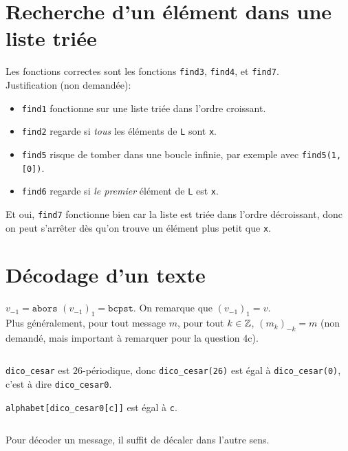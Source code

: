 
\section*{Recherche d'un élément dans une liste triée}

\ques Les fonctions correctes sont les fonctions \texttt{find3}, \texttt{find4}, et \texttt{find7}.\\

Justification (non demandée):
\begin{itemize}[label=$ \bullet $]
    \item \texttt{find1} fonctionne sur une liste triée dans l'ordre croissant.
    \item \texttt{find2} regarde si \emph{tous} les éléments de \texttt{L} sont \texttt{x}.
    \item \texttt{find5} risque de tomber dans une boucle infinie, par exemple avec \texttt{find5(1, [0])}.
    \item \texttt{find6} regarde si \emph{le premier} élément de \texttt{L} est \texttt{x}.
\end{itemize}
Et oui, \texttt{find7} fonctionne bien car la liste est triée dans l'ordre décroissant, donc on peut s'arrêter dès qu'on trouve un élément plus petit que \texttt{x}.

\section*{Décodage d'un texte}

\quessques $ v_{-1} = \texttt{abors} $
\ssques $ (v_{-1})_{1} = \texttt{bcpst} $. On remarque que $ (v_{-1})_1 = v $.\\
Plus généralement, pour tout message $ m $, pour tout $ k \in \mathbb{Z}$, $ (m_k)_{-k} = m$ (non demandé, mais important à remarquer pour la question 4c).

\quessques \inputminted{python}{minted/exams/dico_cesar_correction.py}

\ssques \texttt{dico_cesar} est $ 26 $-périodique, donc \texttt{dico_cesar(26)} est égal à \texttt{dico_cesar(0)}, c'est à dire \texttt{dico_cesar0}.

\quessques \texttt{alphabet[dico_cesar0[c]]} est égal à \texttt{c}.
\ssques \inputminted{python}{minted/exams/code_cesar_correction.py}
\ssques Pour décoder un message, il suffit de décaler dans l'autre sens.
\inputminted{python}{minted/exams/decode_cesar_correction.py}

